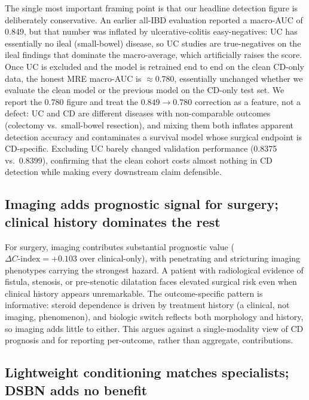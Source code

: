 \documentclass[11pt]{article}
\newcommand{\cindex}{C\text{-index}}
\begin{document}
The single most important framing point is that our headline detection figure is deliberately
conservative. An earlier all-IBD evaluation reported a macro-AUC of 0.849, but that number was
inflated by ulcerative-colitis easy-negatives: UC has essentially no ileal (small-bowel) disease,
so UC studies are true-negatives on the ileal findings that dominate the macro-average, which
artificially raises the score. Once UC is excluded and the model is retrained end to end on the clean
CD-only data, the honest MRE macro-AUC is $\approx 0.780$, essentially unchanged whether we evaluate
the clean model or the previous model on the CD-only test set. We report the 0.780 figure and treat
the $0.849 \rightarrow 0.780$ correction as a feature, not a defect: UC and CD are different diseases
with non-comparable outcomes (colectomy vs.\ small-bowel resection), and mixing them both inflates
apparent detection accuracy and contaminates a survival model whose surgical endpoint is CD-specific.
Excluding UC barely changed validation performance (0.8375 vs.\ 0.8399), confirming that the clean
cohort costs almost nothing in CD detection while making every downstream claim defensible.

\subsection*{Imaging adds prognostic signal for surgery; clinical history dominates the rest}

For surgery, imaging contributes substantial prognostic value ($\Delta\cindex = +0.103$ over
clinical-only), with penetrating and stricturing imaging phenotypes carrying the strongest hazard.
A patient with radiological evidence of fistula, stenosis, or pre-stenotic dilatation faces elevated
surgical risk even when clinical history appears unremarkable. The outcome-specific pattern is
informative: steroid dependence is driven by treatment history (a clinical, not imaging, phenomenon),
and biologic switch reflects both morphology and history, so imaging adds little to either. This
argues against a single-modality view of CD prognosis and for reporting per-outcome, rather than
aggregate, contributions.

\subsection*{Lightweight conditioning matches specialists; DSBN adds no benefit}
\end{document}
